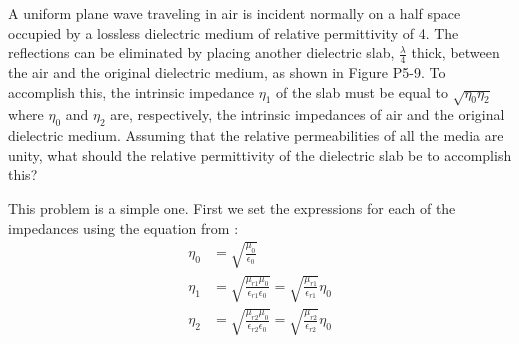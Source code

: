 \documentclass[12pt]{article}
\begin{document}
A uniform plane wave traveling in air is incident normally on a half space occupied by a lossless dielectric medium of relative permittivity of 4. The reflections can be eliminated by placing another dielectric slab, $\frac{\lambda}{4}$ thick, between the air and the original dielectric medium, as shown in Figure P5-9. To accomplish this, the intrinsic impedance $\eta_1$ of the slab must be equal to $\sqrt{\eta_0\eta_2}$ where $\eta_0$ and $\eta_2$ are, respectively, the intrinsic impedances of air and the original dielectric medium. Assuming that the relative permeabilities of all the media are unity, what should the relative permittivity of the dielectric slab be to accomplish this?
\begin{center}
\end{center}
This problem is a simple one. First we set the expressions for each of the impedances using the equation from \cite{balanis_2012}:
\begin{align*}
  \eta_0 &= \sqrt{\frac{\mu_0}{\epsilon_0}}\\
  \eta_1 &= \sqrt{\frac{\mu_{r1}\mu_{0}}{\epsilon_{r1}\epsilon_{0}}} = \sqrt{\frac{\mu_{r1}}{\epsilon_{r1}}}\eta_0\\
  \eta_2 &= \sqrt{\frac{\mu_{r2}\mu_{0}}{\epsilon_{r2}\epsilon_{0}}} = \sqrt{\frac{\mu_{r2}}{\epsilon_{r2}}}\eta_0
\end{align*}
\end{document}
